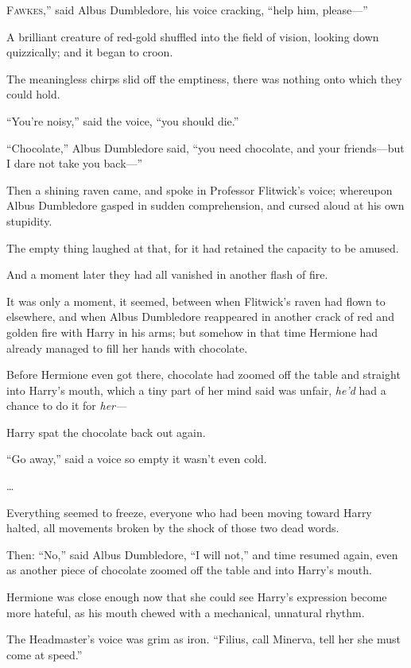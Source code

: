 
\lettrine[ante=“]{F}{awkes},” said
Albus Dumbledore, his voice cracking, “help him, please—”

A brilliant creature of red-gold shuffled into the field of vision, looking down quizzically; and it began to croon.

The meaningless chirps slid off the emptiness, there was nothing onto which they could hold.

“You’re noisy,” said the voice, “you should die.”

“Chocolate,” Albus Dumbledore said, “you need chocolate, and your friends—but I dare not take you back—”

Then a shining raven came, and spoke in Professor Flitwick’s voice; whereupon Albus Dumbledore gasped in sudden comprehension, and cursed aloud at his own stupidity.

The empty thing laughed at that, for it had retained the capacity to be amused.

And a moment later they had all vanished in another flash of fire.

\later

It was only a moment, it seemed, between when Flitwick’s raven had flown to elsewhere, and when Albus Dumbledore reappeared in another crack of red and golden fire with Harry in his arms; but somehow in that time Hermione had already managed to fill her hands with chocolate.

Before Hermione even got there, chocolate had zoomed off the table and straight into Harry’s mouth, which a tiny part of her mind said was unfair, \emph{he’d} had a chance to do it for \emph{her—}

Harry spat the chocolate back out again.

“Go away,” said a voice so empty it wasn’t even cold.

…

Everything seemed to freeze, everyone who had been moving toward Harry halted, all movements broken by the shock of those two dead words.

Then: “No,” said Albus Dumbledore, “I will not,” and time resumed again, even as another piece of chocolate zoomed off the table and into Harry’s mouth.

Hermione was close enough now that she could see Harry’s expression become more hateful, as his mouth chewed with a mechanical, unnatural rhythm.

The Headmaster’s voice was grim as iron. “Filius, call Minerva, tell her she must come at speed.”

